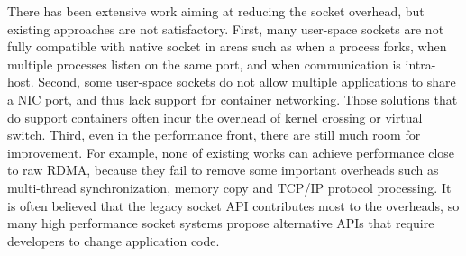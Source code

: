There has been extensive work aiming at reducing the socket overhead, but existing approaches are not satisfactory.
First, many user-space sockets are not fully compatible with native socket in areas such as when a process forks, when multiple processes listen on the same port, and when communication is intra-host.
Second, some user-space sockets do not allow multiple applications to share a NIC port, and thus lack support for container networking.
Those solutions that do support containers often incur the overhead of kernel crossing or virtual switch.
Third, even in the performance front, there are still much room for improvement. For example, none of existing works can achieve performance close to raw RDMA, because they fail to remove some important overheads such as multi-thread synchronization, memory copy and TCP/IP protocol processing.
It is often believed that the legacy socket API contributes most to the overheads, so many high performance socket systems propose alternative APIs that require developers to change application code.

